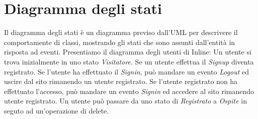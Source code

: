 \section{Diagramma degli stati}
Il diagramma degli stati è un diagramma previso dall'UML per descrivere il comportamente di classi, mostrando gli stati che sono assunti dall'entità in risposta ad eventi.
Presentiamo il diagramma degli utenti di Inline: Un utente si trova inizialmente in uno stato \textit{Visitatore}. Se un utente effettua il \textit{Signup} diventa registrato. Se l'utente ha effettuato il \textit{Signin}, può mandare un evento \textit{Logout} ed uscire dal sito rimanendo un utente registrato. Se l'utente registrato non ha effettuato l'accesso, può mandare un evento \textit{Signin} ed accedere al sito rimanendo utente registrato. Un utente può passare da uno stato di \textit{Registrato} a \textit{Ospite} in seguto ad un'operazione di delete.
